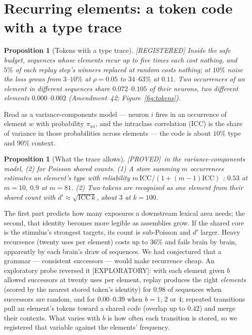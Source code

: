 \documentclass[11pt]{article}
\theoremstyle{definition}
\theoremstyle{plain}
\newtheorem{proposition}[lemma]{Proposition}
\newcommand{\REG}{\textnormal{\footnotesize\textsf{[REGISTERED]}}}
\newcommand{\EXP}{\textnormal{\footnotesize\textsf{[EXPLORATORY]}}}
\newcommand{\PROVED}{\textnormal{\footnotesize\textsf{[PROVED]}}}
\begin{document}
\section{Recurring elements: a token code with a type trace}\label{sec:tokens}

\begin{proposition}[Tokens with a type trace]\label{prop:icc} \REG
Inside the safe budget, sequences whose elements recur up to five times each
cost nothing, and $5\%$ of each replay step's winners replaced at random costs
nothing; at $10\%$ noise the loss grows from $3$--$10\%$ at $\rho = 0.05$ to
$34$--$63\%$ at $0.11$. Two occurrences of an element in different sequences
share $0.072$--$0.105$ of their neurons, two different elements $0.000$--$0.002$
(Amendment~42; Figure~\ref{fig:tokens}).
\end{proposition}

Read as a variance-components model --- neuron $i$ fires in an occurrence of
element $w$ with probability $\pi_{wi}$, and the intraclass correlation (ICC) is
the share of variance in those probabilities across elements --- the code is
about $10\%$ type and $90\%$ context.

\begin{proposition}[What the trace allows]\label{prop:sb} \PROVED\ in the
variance-components model, (2) for Poisson shared counts. (1) A store summing $m$
occurrences estimates an element's type with reliability
$m\,\mathrm{ICC}/(1+(m-1)\mathrm{ICC})$ \citep{spearman1910correlation,brown1910some}:
$0.53$ at $m = 10$, $0.9$ at $m = 81$. (2) Two tokens are recognised as one
element from their shared count with $d' \approx \sqrt{\mathrm{ICC}\,k}$, about
$3$ at $k = 100$.
\end{proposition}

The first part predicts how many exposures a downstream lexical area needs; the
second, that identity becomes more legible as assemblies grow. If the shared
core is the stimulus's strongest targets, its count is sub-Poisson and $d'$
larger. Heavy recurrence (twenty uses per element) costs up to $36\%$ and fails
brain by brain, apparently by each brain's draw of sequences. We had
conjectured that a grammar --- consistent successors --- would make recurrence
cheap. An exploratory probe reversed it \EXP: with each element given $b$
allowed successors at twenty uses per element, replay produces the right
\emph{elements} (scored by the nearest stored token's identity) for $0.98$ of
sequences when successors are random, and for $0.00$--$0.39$ when $b = 1$, $2$ or
$4$; repeated transitions pull an element's tokens toward a shared code (overlap
up to $0.42$) and merge their contexts. What varies with $b$ is how often each
transition is stored, so we registered that variable against the elements'
frequency.
\end{document}

